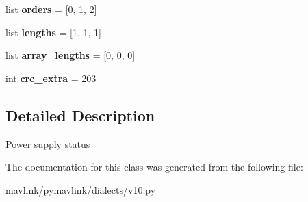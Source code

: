 \begin{DoxyCompactItemize}
\item 
\mbox{\label{classpymavlink_1_1dialects_1_1v10_1_1MAVLink__power__status__message_aea725469807e09b2513f9cabde7a0843}} 
list {\bfseries orders} = \mbox{[}0, 1, 2\mbox{]}
\item 
\mbox{\label{classpymavlink_1_1dialects_1_1v10_1_1MAVLink__power__status__message_a111c07cd22558296ee6b1fbda954499e}} 
list {\bfseries lengths} = \mbox{[}1, 1, 1\mbox{]}
\item 
\mbox{\label{classpymavlink_1_1dialects_1_1v10_1_1MAVLink__power__status__message_ab7511151c98857d295a708102ccb7ba7}} 
list {\bfseries array\+\_\+lengths} = \mbox{[}0, 0, 0\mbox{]}
\item 
\mbox{\label{classpymavlink_1_1dialects_1_1v10_1_1MAVLink__power__status__message_a54347a604c1f4675887b25ae27e4e2a2}} 
int {\bfseries crc\+\_\+extra} = 203
\end{DoxyCompactItemize}


\subsection{Detailed Description}
\begin{DoxyVerb}Power supply status
\end{DoxyVerb}
 

The documentation for this class was generated from the following file\+:\begin{DoxyCompactItemize}
\item 
mavlink/pymavlink/dialects/v10.\+py\end{DoxyCompactItemize}
